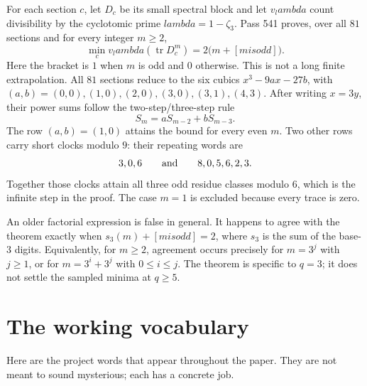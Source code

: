 \documentclass[11pt]{article}
\def\text#1{#1}%
\def\lambda{lambda}%
\begin{document}
\begin{statusbox}[title=The newest exact theorem: a finite clock proves an infinite tower]
For each section $c$, let $D_c$ be its small spectral block and let $v_\lambda$ count divisibility by the cyclotomic prime $\lambda=1-\zeta_3$.  Pass 541 proves, over all $81$ sections and for every integer $m\geq2$,
\[
 \min_c v_\lambda\!\left(\operatorname{tr}D_c^m\right)
   =2\bigl(m+[m\text{ is odd}]\bigr).
\]
Here the bracket is $1$ when $m$ is odd and $0$ otherwise.  This is not a long finite extrapolation.  All $81$ sections reduce to the six cubics $x^3-9ax-27b$, with $(a,b)=(0,0),(1,0),(2,0),(3,0),(3,1),(4,3)$.  After writing $x=3y$, their power sums follow the two-step/three-step rule
\[
 S_m=aS_{m-2}+bS_{m-3}.
\]
The row $(a,b)=(1,0)$ attains the bound for every even $m$.  Two other rows carry short clocks modulo $9$: their repeating words are
\[
 3,0,6 \qquad\hbox{and}\qquad 8,0,5,6,2,3.
\]
Together those clocks attain all three odd residue classes modulo $6$, which is the infinite step in the proof.  The case $m=1$ is excluded because every trace is zero.

An older factorial expression is false in general.  It happens to agree with the theorem exactly when
$s_3(m)+[m\text{ is odd}]=2$, where $s_3$ is the sum of the base-$3$ digits.  Equivalently, for $m\geq2$, agreement occurs precisely for $m=3^j$ with $j\geq1$, or for $m=3^i+3^j$ with $0\leq i\leq j$.  The theorem is specific to $q=3$; it does not settle the sampled minima at $q\geq5$.
\end{statusbox}

\section*{The working vocabulary}

Here are the project words that appear throughout the paper. They are not meant to sound mysterious; each has a concrete job.
\end{document}
